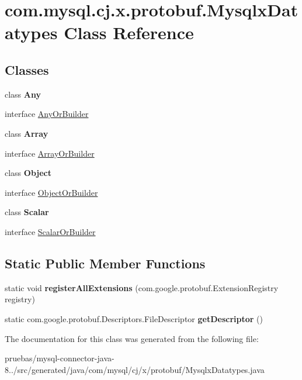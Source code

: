 \hypertarget{classcom_1_1mysql_1_1cj_1_1x_1_1protobuf_1_1_mysqlx_datatypes}{}\section{com.\+mysql.\+cj.\+x.\+protobuf.\+Mysqlx\+Datatypes Class Reference}
\label{classcom_1_1mysql_1_1cj_1_1x_1_1protobuf_1_1_mysqlx_datatypes}
\subsection*{Classes}
\begin{DoxyCompactItemize}
\item 
class {\bfseries Any}
\item 
interface \mbox{\hyperlink{interfacecom_1_1mysql_1_1cj_1_1x_1_1protobuf_1_1_mysqlx_datatypes_1_1_any_or_builder}{Any\+Or\+Builder}}
\item 
class {\bfseries Array}
\item 
interface \mbox{\hyperlink{interfacecom_1_1mysql_1_1cj_1_1x_1_1protobuf_1_1_mysqlx_datatypes_1_1_array_or_builder}{Array\+Or\+Builder}}
\item 
class {\bfseries Object}
\item 
interface \mbox{\hyperlink{interfacecom_1_1mysql_1_1cj_1_1x_1_1protobuf_1_1_mysqlx_datatypes_1_1_object_or_builder}{Object\+Or\+Builder}}
\item 
class {\bfseries Scalar}
\item 
interface \mbox{\hyperlink{interfacecom_1_1mysql_1_1cj_1_1x_1_1protobuf_1_1_mysqlx_datatypes_1_1_scalar_or_builder}{Scalar\+Or\+Builder}}
\end{DoxyCompactItemize}
\subsection*{Static Public Member Functions}
\begin{DoxyCompactItemize}
\item 
\mbox{\label{classcom_1_1mysql_1_1cj_1_1x_1_1protobuf_1_1_mysqlx_datatypes_a4b4a0b953acb8d94afb3b9a0ae9c1562}} 
static void {\bfseries register\+All\+Extensions} (com.\+google.\+protobuf.\+Extension\+Registry registry)
\item 
\mbox{\label{classcom_1_1mysql_1_1cj_1_1x_1_1protobuf_1_1_mysqlx_datatypes_a263040bb1e6f22af44716ceef6571fba}} 
static com.\+google.\+protobuf.\+Descriptors.\+File\+Descriptor {\bfseries get\+Descriptor} ()
\end{DoxyCompactItemize}


The documentation for this class was generated from the following file\+:\begin{DoxyCompactItemize}
\item 
pruebas/mysql-\/connector-\/java-\/8../src/generated/java/com/mysql/cj/x/protobuf/Mysqlx\+Datatypes.\+java\end{DoxyCompactItemize}
